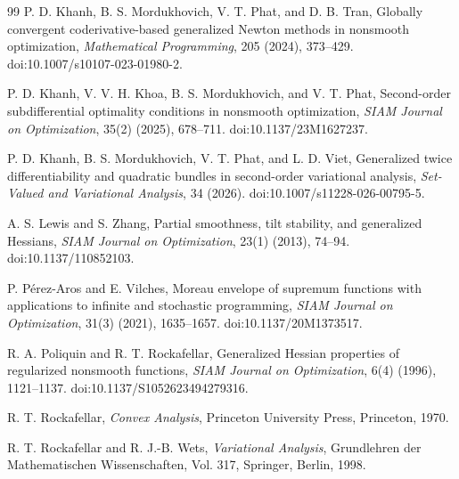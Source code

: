 \documentclass[11pt]{article}
\numberwithin{equation}{section}
\begin{document}
\begin{thebibliography}{99}
		P. D. Khanh, B. S. Mordukhovich, V. T. Phat, and D. B. Tran,
		Globally convergent coderivative-based generalized Newton methods in nonsmooth optimization,
		\emph{Mathematical Programming},
		205 (2024), 373--429.
		doi:10.1007/s10107-023-01980-2.
		
		P. D. Khanh, V. V. H. Khoa, B. S. Mordukhovich, and V. T. Phat,
		Second-order subdifferential optimality conditions in nonsmooth optimization,
		\emph{SIAM Journal on Optimization},
		35(2) (2025), 678--711.
		doi:10.1137/23M1627237.
		
		P. D. Khanh, B. S. Mordukhovich, V. T. Phat, and L. D. Viet,
		Generalized twice differentiability and quadratic bundles in second-order variational analysis,
		\emph{Set-Valued and Variational Analysis},
		34 (2026).
		doi:10.1007/s11228-026-00795-5.
		
		A. S. Lewis and S. Zhang,
		Partial smoothness, tilt stability, and generalized Hessians,
		\emph{SIAM Journal on Optimization},
		23(1) (2013), 74--94.
		doi:10.1137/110852103.
		
		P. P\'erez-Aros and E. Vilches,
		Moreau envelope of supremum functions with applications to infinite and stochastic programming,
		\emph{SIAM Journal on Optimization},
		31(3) (2021), 1635--1657.
		doi:10.1137/20M1373517.
		
		R. A. Poliquin and R. T. Rockafellar,
		Generalized Hessian properties of regularized nonsmooth functions,
		\emph{SIAM Journal on Optimization},
		6(4) (1996), 1121--1137.
		doi:10.1137/S1052623494279316.
		
		R. T. Rockafellar,
		\emph{Convex Analysis},
		Princeton University Press, Princeton, 1970.
		
		R. T. Rockafellar and R. J.-B. Wets,
		\emph{Variational Analysis},
		Grundlehren der Mathematischen Wissenschaften, Vol. 317,
		Springer, Berlin, 1998.
		
	\end{thebibliography}
	
\end{document}
